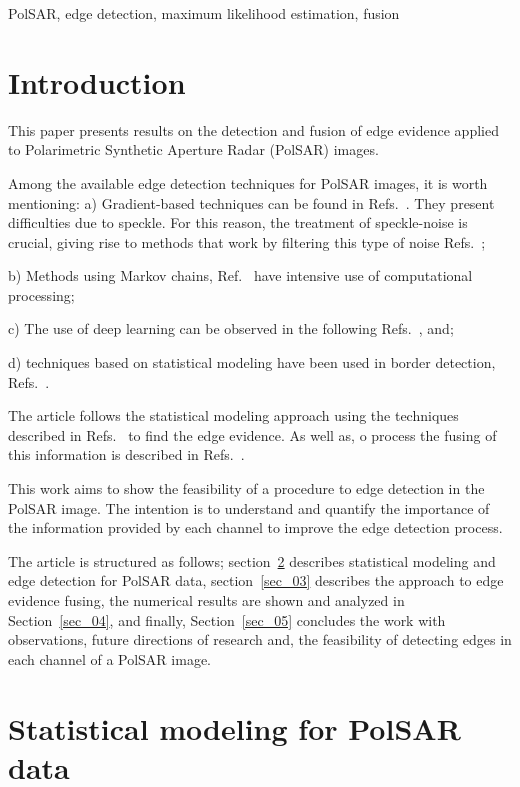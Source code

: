 \documentclass[conference]{IEEEtran}
\begin{document}
\begin{IEEEkeywords}
PolSAR, edge detection, maximum likelihood estimation, fusion
\end{IEEEkeywords}

\section{Introduction}\label{sec_01}

This paper presents results on the detection and fusion of edge evidence applied to Polarimetric Synthetic Aperture Radar (PolSAR) images.

Among the available edge detection techniques for PolSAR images, it is worth mentioning:
a) Gradient-based techniques can be found in Refs.~\cite{tlb, obw, flmc, fyf}. They present difficulties due to speckle. For this reason, the treatment of speckle-noise is crucial, giving rise to methods that work by filtering this type of noise Refs.~\cite{ lee, law, cgaf}; 

b) Methods using Markov chains, Ref.~\cite{bf} have intensive use of computational processing;

c) The use of deep learning can be observed in the following Refs.~\cite{bac, ztmxzxf, tabmm, sglmla}, and;

d) techniques based on statistical modeling have been used in border detection, Refs.~\cite{gmbf, fbgm, horrit}.

The article follows the statistical modeling approach using the techniques described in Refs.~\cite{fbgm, nhfc, bmf_2019} to find the edge evidence. As well as, o process the fusing of this information is described in Refs.~\cite{mit, sg}.

This work aims to show the feasibility of a procedure to edge detection in the PolSAR image. The intention is to understand and quantify the importance of the information provided by each channel to improve the edge detection process.

The article is structured as follows; section~\ref{sec_02} describes statistical modeling and edge detection for PolSAR data, section~\ref{sec_03} describes the approach to edge evidence fusing, the numerical results are shown and analyzed in Section~\ref{sec_04}, and finally, Section~\ref{sec_05} concludes the work with observations, future directions of research and, the feasibility of detecting edges in each channel of a PolSAR image.

\section{Statistical modeling for PolSAR data}\label{sec_02}
\end{document}
